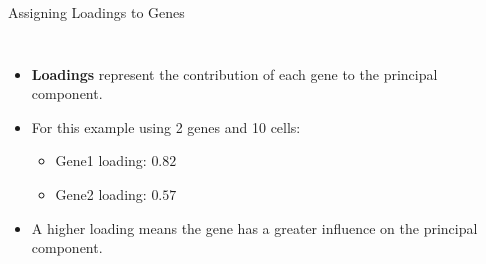 \begin{frame}[allowframebreaks]{Assigning Loadings to Genes}
\begin{columns}
\begin{column}{0.5\textwidth}
\begin{figure}
        \end{figure}
    \end{column}
    \end{columns}
    \begin{itemize}
        \setlength{\itemsep}{-0.5em}
        \item \textbf{Loadings} represent the contribution of each gene to the principal component.
        \item For this example using 2 genes and 10 cells:
        \begin{itemize}
            \setlength{\itemsep}{-0.5em}
            \item Gene1 loading: $0.82$
            \item Gene2 loading: $0.57$
        \end{itemize}
        \item A higher loading means the gene has a greater influence on the principal component.
    \end{itemize}
\end{frame}


